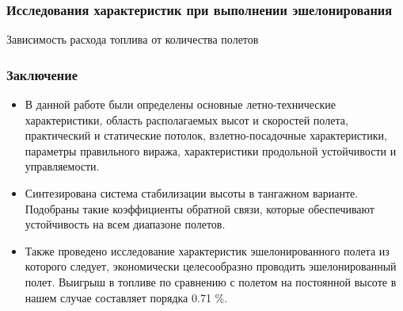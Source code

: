 \documentclass{beamer}
\begin{document}
\begin{frame}[t]
    \frametitle{Исследования характеристик при выполнении эшелонирования}
    \begin{center}
        Зависимость расхода топлива от количества полетов 
        \resizebox{0.7\textwidth}{!}{}
    \end{center}
\end{frame}

\begin{frame}[t]
    \frametitle{Заключение}
    \begin{itemize}
        \item В данной работе были определены основные летно-технические характеристики,
            область располагаемых высот и скоростей полета, практический и статические
            потолок, взлетно-посадочные характеристики, параметры правильного виража, 
            характеристики продольной устойчивости и управляемости.
        \item Синтезирована система стабилизации высоты в тангажном варианте.
            Подобраны такие коэффициенты обратной связи, которые обеспечивают
            устойчивость на всем диапазоне полетов.
        \item Также проведено исследование характеристик эшелонированного полета
            из которого следует, экономически целесообразно проводить
            эшелонированный полет. Выигрыш в топливе по сравнению с полетом на
            постоянной высоте в нашем случае составляет порядка 0.71 \%. 
    \end{itemize}
\end{frame}
\end{document}
